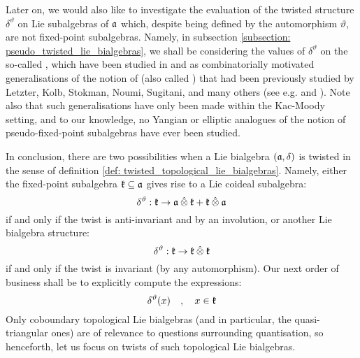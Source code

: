         \begin{remark} \label{remark: notations_for_twisted_lie_bialgebraic_structures}
            Later on, we would also like to investigate the evaluation of the twisted structure $\delta^{\vartheta}$ on Lie subalgebras of $\mathfrak{a}$ which, despite being defined by the automorphism $\vartheta$, are not fixed-point subalgebras. Namely, in subsection \ref{subsection: pseudo_twisted_lie_bialgebras}, we shall be considering the values of $\delta^{\vartheta}$ on the so-called , which have been studied in \cite{regelskis_vlaar_finite_QSPs_via_generalised_satake_diagrams} and \cite{regelskis_vlaar_kac_moody_pseudo_symmetric_pairs} as combinatorially motivated generalisations of the notion of  (also called ) that had been previously studied by Letzter, Kolb, Stokman, Noumi, Sugitani, and many others (see e.g. \cite{letzter_coideal_subalgebras_and_QSPs} and \cite{kolb_kac_moody_QSPs}). Note also that such generalisations have only been made within the Kac-Moody setting, and to our knowledge, no Yangian or elliptic analogues of the notion of pseudo-fixed-point subalgebras have ever been studied.
        \end{remark}
        
        In conclusion, there are two possibilities when a Lie bialgebra $(\mathfrak{a}, \delta)$ is twisted in the sense of definition \ref{def: twisted_topological_lie_bialgebras}. Namely, either the fixed-point subalgebra $\mathfrak{k} \subseteq \mathfrak{a}$ gives rise to a Lie coideal subalgebra:
            $$\delta^{\vartheta}: \k \to \a \hattensor \k + \k \hattensor \a$$
        if and only if the twist is anti-invariant and by an involution, or another Lie bialgebra structure:
            $$\delta^{\vartheta}: \k \to \k \hattensor \k$$
        if and only if the twist is invariant (by any automorphism). Our next order of business shall be to explicitly compute the expressions:
            $$\delta^{\vartheta}(x) \quad, \quad x \in \mathfrak{k}$$
        Only coboundary topological Lie bialgebras (and in particular, the quasi-triangular ones) are of relevance to questions surrounding quantisation, so henceforth, let us focus on twists of such topological Lie bialgebras.

